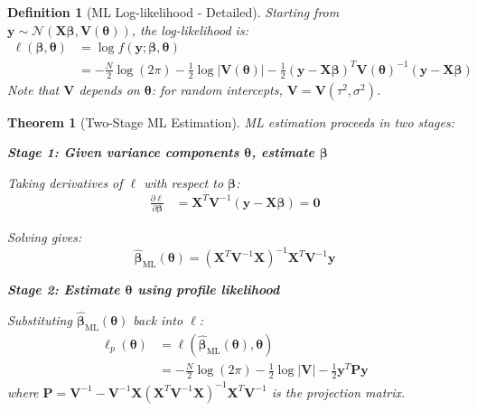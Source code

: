 \documentclass{article}
\newtheorem{definition}{Definition}
\newtheorem{theorem}{Theorem}
\begin{document}
\begin{definition}[ML Log-likelihood - Detailed]
Starting from $\mathbf{y} \sim \mathcal{N}(\mathbf{X}\boldsymbol{\beta}, \mathbf{V}(\boldsymbol{\theta}))$, the log-likelihood is:
\begin{align}
\ell(\boldsymbol{\beta}, \boldsymbol{\theta}) &= \log f(\mathbf{y}; \boldsymbol{\beta}, \boldsymbol{\theta}) \\
&= -\frac{N}{2}\log(2\pi) - \frac{1}{2}\log|\mathbf{V}(\boldsymbol{\theta})| - \frac{1}{2}(\mathbf{y} - \mathbf{X}\boldsymbol{\beta})^T\mathbf{V}(\boldsymbol{\theta})^{-1}(\mathbf{y} - \mathbf{X}\boldsymbol{\beta})
\end{align}
Note that $\mathbf{V}$ depends on $\boldsymbol{\theta}$: for random intercepts, $\mathbf{V} = \mathbf{V}(\tau^2, \sigma^2)$.
\end{definition}

\begin{theorem}[Two-Stage ML Estimation]
ML estimation proceeds in two stages:

\textbf{Stage 1: Given variance components $\boldsymbol{\theta}$, estimate $\boldsymbol{\beta}$}

Taking derivatives of $\ell$ with respect to $\boldsymbol{\beta}$:
\begin{align}
\frac{\partial \ell}{\partial \boldsymbol{\beta}} &= \mathbf{X}^T\mathbf{V}^{-1}(\mathbf{y} - \mathbf{X}\boldsymbol{\beta}) = \mathbf{0}
\end{align}

Solving gives:
\begin{equation}
\hat{\boldsymbol{\beta}}_{\text{ML}}(\boldsymbol{\theta}) = (\mathbf{X}^T\mathbf{V}^{-1}\mathbf{X})^{-1}\mathbf{X}^T\mathbf{V}^{-1}\mathbf{y}
\end{equation}

\textbf{Stage 2: Estimate $\boldsymbol{\theta}$ using profile likelihood}

Substituting $\hat{\boldsymbol{\beta}}_{\text{ML}}(\boldsymbol{\theta})$ back into $\ell$:
\begin{align}
\ell_p(\boldsymbol{\theta}) &= \ell(\hat{\boldsymbol{\beta}}_{\text{ML}}(\boldsymbol{\theta}), \boldsymbol{\theta}) \\
&= -\frac{N}{2}\log(2\pi) - \frac{1}{2}\log|\mathbf{V}| - \frac{1}{2}\mathbf{y}^T\mathbf{P}\mathbf{y}
\end{align}
where $\mathbf{P} = \mathbf{V}^{-1} - \mathbf{V}^{-1}\mathbf{X}(\mathbf{X}^T\mathbf{V}^{-1}\mathbf{X})^{-1}\mathbf{X}^T\mathbf{V}^{-1}$ is the projection matrix.
\end{theorem}
\end{document}
